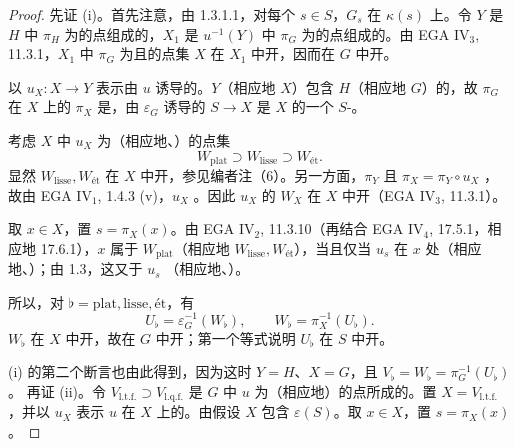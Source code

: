 \begin{proof}
先证 (i)。首先注意，由 1.3.1.1，对每个 $s\in S$，$G_s$ 在 $\kappa(s)$ 上。令 $Y$ 是 $H$ 中 $\pi_H$ 为的点组成的，$X_1$ 是 $u^{-1}(Y)$ 中 $\pi_G$ 为的点组成的。由 EGA IV$_3$, 11.3.1，$X_1$ 中 $\pi_G$ 为且的点集 $X$ 在 $X_1$ 中开，因而在 $G$ 中开。

以 $u_X:X\to Y$ 表示由 $u$ 诱导的。$Y$（相应地 $X$）包含 $H$（相应地 $G$）的，故 $\pi_G$ 在 $X$ 上的 $\pi_X$ 是，由 $\varepsilon_G$ 诱导的 $S\to X$ 是 $X$ 的一个 $S$-。

考虑 $X$ 中 $u_X$ 为（相应地、）的点集
\[
W_{\mathrm{plat}}\supset W_{\mathrm{lisse}}\supset W_{\text{ét}}.
\]
显然 $W_{\mathrm{lisse}},W_{\text{ét}}$ 在 $X$ 中开，参见编者注（6）。另一方面，$\pi_Y$ 且 $\pi_X=\pi_Y\circ u_X$ ，故由 EGA IV$_1$, 1.4.3 (v)，$u_X$ 。因此 $u_X$ 的 $W_X$ 在 $X$ 中开（EGA IV$_3$, 11.3.1）。

取 $x\in X$，置 $s=\pi_X(x)$。由 EGA IV$_2$, 11.3.10（再结合 EGA IV$_4$, 17.5.1，相应地 17.6.1），$x$ 属于 $W_{\mathrm{plat}}$（相应地 $W_{\mathrm{lisse}},W_{\text{ét}}$），当且仅当 $u_s$ 在 $x$ 处（相应地、）；由 1.3，这又于 $u_s$ （相应地、）。

所以，对 $\flat=\mathrm{plat},\mathrm{lisse},\text{ét}$，有
\[
U_\flat=\varepsilon_G^{-1}(W_\flat),\qquad W_\flat=\pi_X^{-1}(U_\flat).
\]
$W_\flat$ 在 $X$ 中开，故在 $G$ 中开；第一个等式说明 $U_\flat$ 在 $S$ 中开。

(i) 的第二个断言也由此得到，因为这时 $Y=H$、$X=G$，且 $V_\flat=W_\flat=\pi_G^{-1}(U_\flat)$。
再证 (ii)。令 $V_{\mathrm{l.t.f.}}\supset V_{\mathrm{l.q.f.}}$ 是 $G$ 中 $u$ 为（相应地）的点所成的。置 $X=V_{\mathrm{l.t.f.}}$，并以 $u_X$ 表示 $u$ 在 $X$ 上的。由假设 $X$ 包含 $\varepsilon(S)$。取 $x\in X$，置 $s=\pi_X(x)$。


\end{proof}
